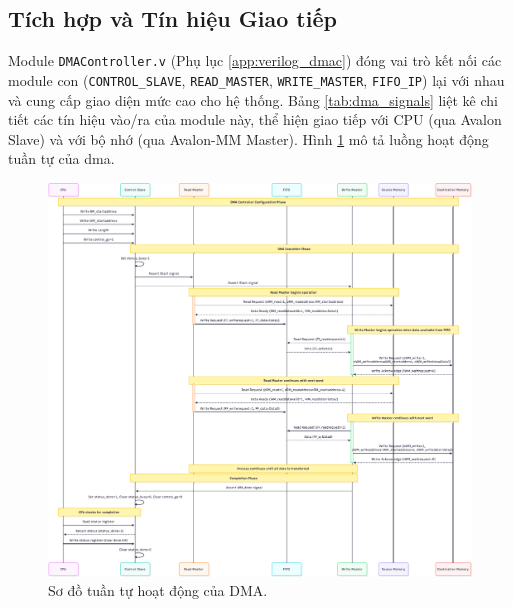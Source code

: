 \FloatBarrier

\subsection{Tích hợp và Tín hiệu Giao tiếp}
\label{subsec:integration_signals} %
Module \texttt{DMAController.v} (Phụ lục \ref{app:verilog_dmac}) đóng vai trò kết nối các module con (\texttt{CONTROL\_SLAVE}, \texttt{READ\_MASTER}, \texttt{WRITE\_MASTER}, \texttt{FIFO\_IP}) lại với nhau và cung cấp giao diện mức cao cho hệ thống. Bảng \ref{tab:dma_signals} liệt kê chi tiết các tín hiệu vào/ra của module này, thể hiện giao tiếp với CPU (qua Avalon Slave) và với bộ nhớ (qua Avalon-MM Master). Hình \ref{fig:02_10_SystemSequenceDiagram} mô tả luồng hoạt động tuần tự của \acrshort{dma}.

\begin{figure}[htbp]
    \centering
    \includegraphics[width=\linewidth]{Images/02_10_SystemSequenceDiagram}
    \caption{Sơ đồ tuần tự hoạt động của DMA.}
    \label{fig:02_10_SystemSequenceDiagram}
\end{figure}

